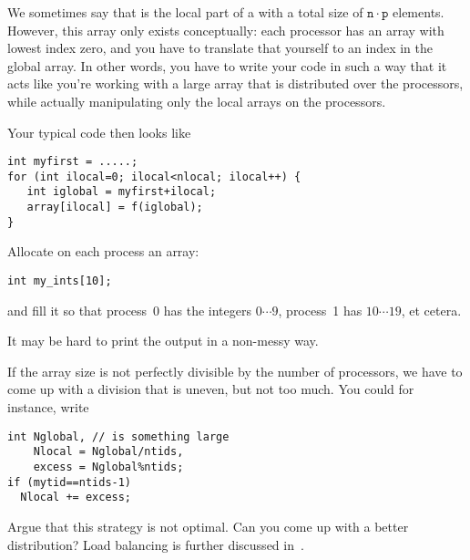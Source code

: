 We sometimes say that  is the local part
of a  with a total size of
$\mathtt{n}\cdot\mathtt{p}$
elements.
However, this array only exists
conceptually: each processor has an array with lowest index zero,
and you have to translate that yourself to an index in the global
array.
In other words, you have to write your code in such a way that
it acts like you're working with a large array that is distributed
over the processors, while
actually manipulating only the local arrays on the processors.

Your typical code then looks like

\begin{lstlisting}
int myfirst = .....;
for (int ilocal=0; ilocal<nlocal; ilocal++) {
   int iglobal = myfirst+ilocal;
   array[ilocal] = f(iglobal);
}
\end{lstlisting}

\begin{exercise}
  \label{ex:array-ints}
  Allocate on each process an array:
\begin{lstlisting}
int my_ints[10];    
\end{lstlisting}
and fill it so that process~0 has the integers $0\cdots 9$, process~1 has $10\cdots 19$,
et cetera.

It may be hard to print the output in a non-messy way.
\end{exercise}

If the array size is not perfectly divisible by the number of processors,
we have to come up with a division that is uneven, but not too much.
You could for instance, write

\begin{lstlisting}
int Nglobal, // is something large
    Nlocal = Nglobal/ntids,
    excess = Nglobal%ntids;
if (mytid==ntids-1) 
  Nlocal += excess;
\end{lstlisting}

\begin{exercise}
  Argue that this strategy is not optimal. Can you come up with a
  better distribution?
  Load balancing is further discussed in~.
\end{exercise}

\begin{comment}
  \begin{exercise}
    \label{ex:inproduct}
    Implement an inner product routine: let $x$ be a
    distributed vector of size~$N$ with elements $x[i]=i$,
    and compute~$x^tx$.
    As before, the right value is $(2N^3+3N^2+N)/6$.

    Use the inner product value to scale to vector so that it has
    norm~1.
    Check that your computation is correct.
  \end{exercise}
\end{comment}

